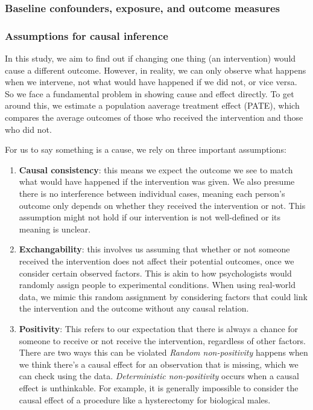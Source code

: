 \documentclass[
  singlecolumn,
  9pt]{article}
\begin{document}
\subsubsection{Baseline confounders, exposure, and outcome
measures}\label{baseline-confounders-exposure-and-outcome-measures}

\subsubsection{Assumptions for causal
inference}\label{assumptions-for-causal-inference}

In this study, we aim to find out if changing one thing (an
intervention) would cause a different outcome. However, in reality, we
can only observe what happens when we intervene, not what would have
happened if we did not, or vice versa. So we face a fundamental problem
in showing cause and effect directly. To get around this, we estimate a
population aaverage treatment effect (PATE), which compares the average
outcomes of those who received the intervention and those who did not.

For us to say something is a cause, we rely on three important
assumptions:

\begin{enumerate}
\def\labelenumi{\arabic{enumi}.}
\item
  \textbf{Causal consistency}: this means we expect the outcome we see
  to match what would have happened if the intervention was given. We
  also presume there is no interference between individual cases,
  meaning each person's outcome only depends on whether they received
  the intervention or not. This assumption might not hold if our
  intervention is not well-defined or its meaning is unclear.
\item
  \textbf{Exchangability}: this involves us assuming that whether or not
  someone received the intervention does not affect their potential
  outcomes, once we consider certain observed factors. This is akin to
  how psychologists would randomly assign people to experimental
  conditions. When using real-world data, we mimic this random
  assignment by considering factors that could link the intervention and
  the outcome without any causal relation.
\item
  \textbf{Positivity}: This refers to our expectation that there is
  always a chance for someone to receive or not receive the
  intervention, regardless of other factors. There are two ways this can
  be violated \emph{Random non-positivity} happens when we think there's
  a causal effect for an observation that is missing, which we can check
  using the data. \emph{Deterministic non-positivity} occurs when a
  causal effect is unthinkable. For example, it is generally impossible
  to consider the causal effect of a procedure like a hysterectomy for
  biological males.
\end{enumerate}
\end{document}

